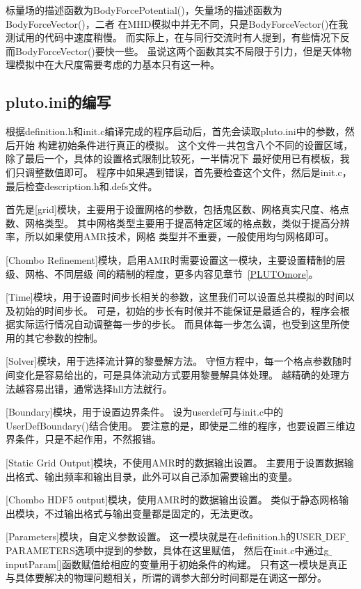 标量场的描述函数为BodyForcePotential()，矢量场的描述函数为BodyForceVector()，二者
在MHD模拟中并无不同，只是BodyForceVector()在我测试用的代码中速度稍慢。
而实际上，在与同行交流时有人提到，有些情况下反而BodyForceVector()要快一些。
虽说这两个函数其实不局限于引力，但是天体物理模拟中在大尺度需要考虑的力基本只有这一种。

\subsection{pluto.ini的编写}
根据definition.h和init.c编译完成的程序启动后，首先会读取pluto.ini中的参数，然后开始
构建初始条件进行真正的模拟。
这个文件一共包含八个不同的设置区域，除了最后一个，具体的设置格式限制比较死，一半情况下
最好使用已有模板，我们只调整数值即可。
程序中如果遇到错误，首先要检查这个文件，然后是init.c，最后检查description.h和.defs文件。

首先是[grid]模块，主要用于设置网格的参数，包括鬼区数、网格真实尺度、格点数、网格类型。
其中网格类型主要用于提高特定区域的格点数，类似于提高分辨率，所以如果使用AMR技术，网格
类型并不重要，一般使用均匀网格即可。

[Chombo Refinement]模块，启用AMR时需要设置这一模块，主要设置精制的层级、网格、不同层级
间的精制的程度，更多内容见章节~\ref{PLUTOmore}。

[Time]模块，用于设置时间步长相关的参数，这里我们可以设置总共模拟的时间以及初始的时间步长。
可是，初始的步长有时候并不能保证是最适合的，程序会根据实际运行情况自动调整每一步的步长。
而具体每一步怎么调，也受到这里所使用的其它参数的控制。

[Solver]模块，用于选择流计算的黎曼解方法。
守恒方程中，每一个格点参数随时间变化是容易给出的，可是具体流动方式要用黎曼解具体处理。
越精确的处理方法越容易出错，通常选择hll方法就行。

[Boundary]模块，用于设置边界条件。
设为userdef可与init.c中的UserDefBoundary()结合使用。
要注意的是，即使是二维的程序，也要设置三维边界条件，只是不起作用，不然报错。

[Static Grid Output]模块，不使用AMR时的数据输出设置。
主要用于设置数据输出格式、输出频率和输出目录，此外可以自己添加需要输出的变量。

[Chombo HDF5 output]模块，使用AMR时的数据输出设置。
类似于静态网格输出模块，不过输出格式与输出变量都是固定的，无法更改。

[Parameters]模块，自定义参数设置。
这一模块就是在definition.h的USER$\_$DEF$\_$PARAMETERS选项中提到的参数，具体在这里赋值，
然后在init.c中通过g$\_$inputParam[]函数赋值给相应的变量用于初始条件的构建。
只有这一模块是真正与具体要解决的物理问题相关，所谓的调参大部分时间都是在调这一部分。

